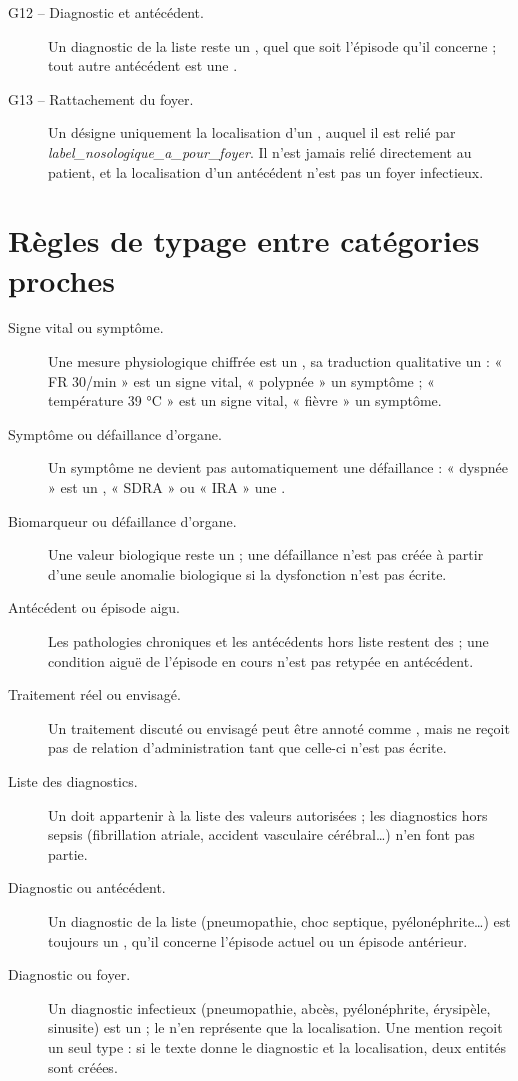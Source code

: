 \begin{description}
  \item[G12 -- Diagnostic et antécédent.] Un diagnostic de la liste  reste un , quel que soit l'épisode qu'il concerne ; tout autre antécédent est une .
  \item[G13 -- Rattachement du foyer.] Un  désigne uniquement la localisation d'un , auquel il est relié par \emph{label\_nosologique\_a\_pour\_foyer}. Il n'est jamais relié directement au patient, et la localisation d'un antécédent n'est pas un foyer infectieux.
\end{description}

\section{Règles de typage entre catégories proches}\label{annexe:regles-typage}

\begin{description}
  \item[Signe vital ou symptôme.] Une mesure physiologique chiffrée est un , sa traduction qualitative un  : « FR 30/min » est un signe vital, « polypnée » un symptôme ; « température 39 °C » est un signe vital, « fièvre » un symptôme.
  \item[Symptôme ou défaillance d'organe.] Un symptôme ne devient pas automatiquement une défaillance : « dyspnée » est un , « SDRA » ou « IRA » une .
  \item[Biomarqueur ou défaillance d'organe.] Une valeur biologique reste un  ; une défaillance n'est pas créée à partir d'une seule anomalie biologique si la dysfonction n'est pas écrite.
  \item[Antécédent ou épisode aigu.] Les pathologies chroniques et les antécédents hors liste restent des  ; une condition aiguë de l'épisode en cours n'est pas retypée en antécédent.
  \item[Traitement réel ou envisagé.] Un traitement discuté ou envisagé peut être annoté comme , mais ne reçoit pas de relation d'administration tant que celle-ci n'est pas écrite.
  \item[Liste des diagnostics.] Un  doit appartenir à la liste des valeurs autorisées ; les diagnostics hors sepsis (fibrillation atriale, accident vasculaire cérébral\dots) n'en font pas partie.
  \item[Diagnostic ou antécédent.] Un diagnostic de la liste (pneumopathie, choc septique, pyélonéphrite\dots) est toujours un , qu'il concerne l'épisode actuel ou un épisode antérieur.
  \item[Diagnostic ou foyer.] Un diagnostic infectieux (pneumopathie, abcès, pyélonéphrite, érysipèle, sinusite) est un  ; le  n'en représente que la localisation. Une mention reçoit un seul type : si le texte donne le diagnostic et la localisation, deux entités sont créées.
\end{description}

